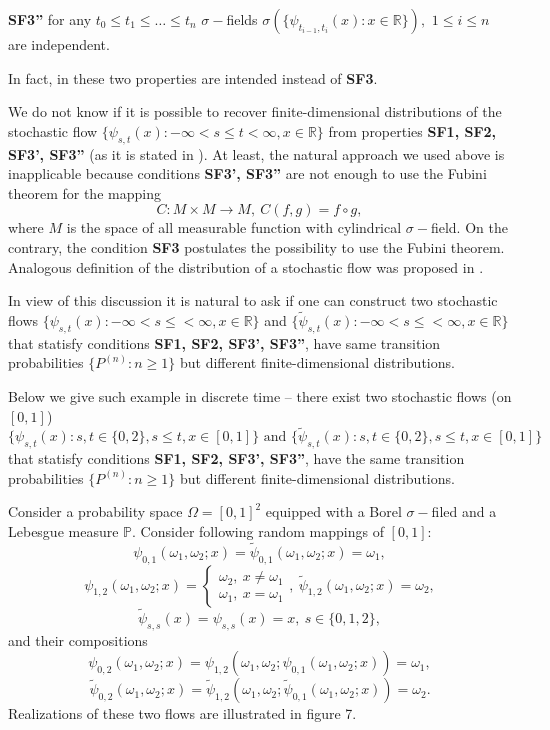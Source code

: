 \documentclass[a4paper,12pt]{article}
\newcommand{\1}{1\!\!\,{\rm I}}
\theoremstyle{plain}
\begin{document}
{\bf SF3''} for any $t_0\leq t_1\leq \ldots\leq t_n$ $\sigma-$fields $\sigma(\{\psi_{t_{i-1},t_i}(x):x\in \mathbb{R}\}),$ $1\leq i\leq n$ are independent.

In fact, in \cite{LJR} these two properties are intended instead of {\bf SF3}.

We do not know if it is possible to recover finite-dimensional distributions of the stochastic flow $\{\psi_{s,t}(x):-\infty<s\leq t<\infty, x\in \mathbb{R}\}$ from properties {\bf SF1, SF2, SF3', SF3''} (as it is stated in \cite[Rem. 1.4]{LJR}). At least, the natural approach we used above is inapplicable because conditions {\bf SF3', SF3''} are not enough to use the Fubini theorem for the mapping 
$$
C:M\times M\to M, \ C(f,g)=f\circ g,
$$
where $M$ is the space of all measurable function with cylindrical $\sigma-$field. On the contrary, the condition {\bf SF3} postulates the possibility to use the Fubini theorem. Analogous definition of the distribution of a stochastic flow was proposed in \cite{Darling}.

In view of this discussion it is natural to ask if one can construct  two stochastic flows $\{\psi_{s,t}(x): -\infty<s\leq <\infty, x\in \mathbb{R}\}$  and 
$\{\tilde{\psi}_{s,t}(x): -\infty<s\leq <\infty, x\in \mathbb{R}\}$ 
that statisfy conditions {\bf SF1, SF2, SF3', SF3''}, have same transition probabilities $\{P^{(n)}:n\geq 1\}$ but different finite-dimensional distributions. 

Below we give such example in discrete time -- there exist two stochastic flows (on $[0,1]$) 
$$
\{\psi_{s,t}(x): s,t\in\{0,2\}, s\leq t,x\in [0,1]\} \mbox{ and } \{\tilde{\psi}_{s,t}(x): s,t\in\{0,2\}, s\leq t,x\in [0,1]\}
$$ 
that statisfy conditions {\bf SF1, SF2, SF3', SF3''}, have the same transition probabilities $\{P^{(n)}:n\geq 1\}$ but different finite-dimensional distributions.


Consider a probability space $\Omega=[0,1]^2$ equipped with a Borel $\sigma-$filed and a Lebesgue measure $\mathbb{P}.$ Consider following random mappings of $[0,1]:$
$$
\psi_{0,1}(\omega_1,\omega_2;x)=\tilde{\psi}_{0,1}(\omega_1,\omega_2;x)=\omega_1,
$$
$$
\psi_{1,2}(\omega_1,\omega_2;x)=\begin{cases}
\omega_2, \ x\ne \omega_1 \\
\omega_1, \ x=\omega_1
\end{cases},\ 
\tilde{\psi}_{1,2}(\omega_1,\omega_2;x)=\omega_2,
$$
$$
\tilde{\psi}_{s,s}(x)=\psi_{s,s}(x)=x, \ s\in\{0,1,2\},
$$
and their compositions
$$
\psi_{0,2}(\omega_1,\omega_2;x)=\psi_{1,2}(\omega_1,\omega_2;\psi_{0,1}(\omega_1,\omega_2;x))=\omega_1,
$$
$$
\tilde{\psi}_{0,2}(\omega_1,\omega_2;x)=\tilde{\psi}_{1,2}(\omega_1,\omega_2;\tilde{\psi}_{0,1}(\omega_1,\omega_2;x))=\omega_2.
$$
Realizations of these two flows are illustrated in figure 7.
\end{document}
